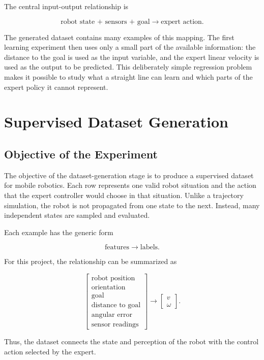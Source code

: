 \documentclass[10pt,twocolumn,a4paper]{article}
\begin{document}
The central input-output relationship is

\[
    \text{robot state + sensors + goal}
    \longrightarrow
    \text{expert action}.
\]

The generated dataset contains many examples of this mapping. The first
learning experiment then uses only a small part of the available information:
the distance to the goal is used as the input variable, and the expert linear
velocity is used as the output to be predicted. This deliberately simple
regression problem makes it possible to study what a straight line can learn
and which parts of the expert policy it cannot represent.

\section{Supervised Dataset Generation}

\subsection{Objective of the Experiment}

The objective of the dataset-generation stage is to produce a supervised
dataset for mobile robotics. Each row represents one valid robot situation and
the action that the expert controller would choose in that situation. Unlike a
trajectory simulation, the robot is not propagated from one state to the next.
Instead, many independent states are sampled and evaluated.

Each example has the generic form

\[
    \text{features}
    \longrightarrow
    \text{labels}.
\]

For this project, the relationship can be summarized as

\[
\begin{bmatrix}
    \text{robot position}\\
    \text{orientation}\\
    \text{goal}\\
    \text{distance to goal}\\
    \text{angular error}\\
    \text{sensor readings}
\end{bmatrix}
\longrightarrow
\begin{bmatrix}
    v\\
    \omega
\end{bmatrix}.
\]

Thus, the dataset connects the state and perception of the robot with the
control action selected by the expert.
\end{document}
